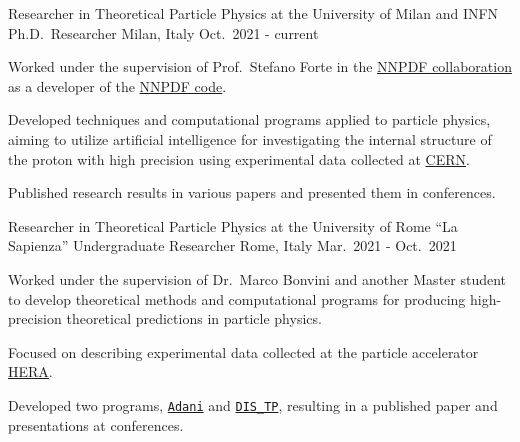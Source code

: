 

\begin{cventries}

  \cventry
  {Researcher in Theoretical Particle Physics at the University of Milan and INFN}
  {Ph.D.\ Researcher}
  {Milan, Italy}
  {Oct.\ 2021 - current}
  {
      \begin{cvitems} %
          \item Worked under the supervision of Prof.\ Stefano Forte in the \href{https://nnpdf.mi.infn.it}{NNPDF collaboration} 
          as a developer of the \href{https://github.com/NNPDF}{NNPDF code}.
          \item Developed techniques and computational programs applied to particle physics, aiming to utilize artificial intelligence for 
          investigating the internal structure of the proton with high precision using experimental data collected at \href{https://home.cern}{CERN}.
          \item Published research results in various papers and presented them in conferences.
      \end{cvitems}
    }

    \cventry
{Researcher in Theoretical Particle Physics at the University of Rome ``La Sapienza''}
{Undergraduate Researcher}
{Rome, Italy}
{Mar.\ 2021 - Oct.\ 2021}
{
      \begin{cvitems} %
        \item Worked under the supervision of Dr.\ Marco Bonvini and another Master student to develop theoretical methods and computational programs for producing high-precision theoretical predictions in particle physics.
        \item Focused on describing experimental data collected at the particle accelerator \href{https://en.wikipedia.org/wiki/HERA_(particle_accelerator)}{HERA}.
        \item Developed two programs, \href{https://github.com/niclaurenti/adani}{\texttt{Adani}} and \href{https://github.com/andreab1997/DIS_TP}{\texttt{DIS\_TP}}, resulting in a published paper and presentations at conferences.
      \end{cvitems}
    }


\end{cventries}